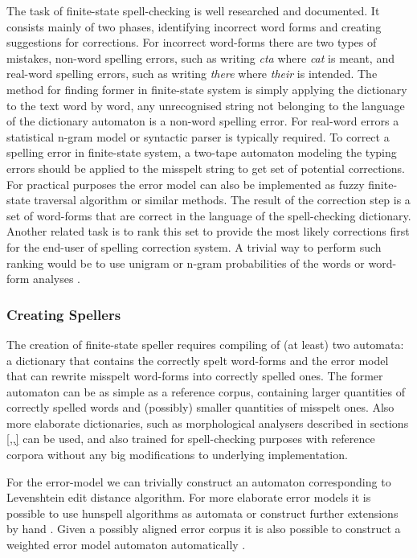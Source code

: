 \documentclass{llncs}
\begin{document}
The task of finite-state spell-checking is well researched and documented. It
consists mainly of two phases, identifying incorrect word forms and creating
suggestions for corrections. For incorrect word-forms there are two types of
mistakes, non-word spelling errors, such as writing \emph{cta} where \emph{cat}
is meant, and real-word spelling errors, such as writing \emph{there} where
\emph{their} is intended. The method for finding former in finite-state system
is simply applying the dictionary to the text word by word, any unrecognised
string not belonging to the language of the dictionary automaton is a non-word
spelling error. For real-word errors a statistical n-gram model or syntactic
parser is typically required\cite{}. To correct a spelling error in finite-state
system, a two-tape automaton modeling the typing errors should be applied to
the misspelt string to get set of potential corrections\cite{pirinen/2010/lrec}.
For practical purposes the error model can also be implemented as
fuzzy finite-state traversal algorithm or similar methods\cite{oflazer/2002}. The result
of the correction step is a set of word-forms that are correct in the
language of the spell-checking dictionary. Another related task is to rank this
set to provide the most likely corrections first for the end-user of spelling
correction system. A trivial way to perform such ranking would be to use
unigram \cite{pirinen/2010/lrec} or n-gram probabilities of the words 
\cite{mays/1991} or word-form analyses \cite{pirinen/2012/cicling}.

\subsubsection{Creating Spellers}

The creation of finite-state speller requires compiling of (at least) two
automata: a dictionary that contains the correctly spelt word-forms and the
error model that can rewrite misspelt word-forms into correctly spelled ones.
The former automaton can be as simple as a reference corpus, containing larger
quantities of correctly spelled words and (possibly) smaller quantities of
misspelt ones\cite{norvig/2010}. Also more elaborate dictionaries, such as
morphological analysers described in sections \ref{,,} can be used, and also
trained for spell-checking purposes with reference corpora without any big
modifications to underlying implementation\cite{pirinen/2010/lrec}.

For the error-model we can trivially construct an automaton corresponding to
Levenshtein edit distance algorithm\cite{oflazer/1996,agata/2002}. For more elaborate error models
it is possible to use hunspell algorithms as automata \cite{pirinen/2010/il} or
construct further extensions by hand \cite{pirinen/2010/lrec}. Given a possibly
aligned error corpus it is also possible to construct a weighted error model
automaton automatically \cite{}.
\end{document}
